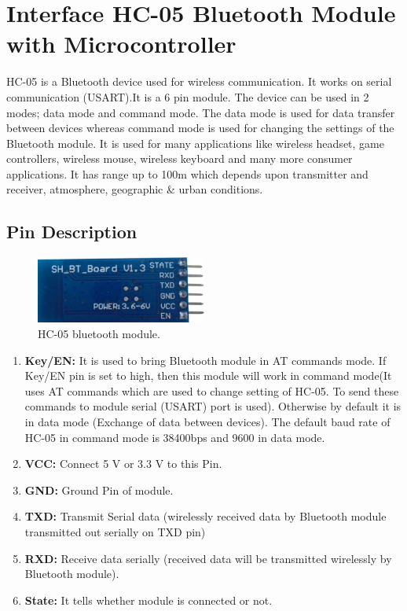 \documentclass[12pt, a4paper, twoside]{report}
\begin{document}
\section{Interface HC-05 Bluetooth Module with Microcontroller}
HC-05 is a Bluetooth device used for wireless communication. It works on serial communication (USART).It is a 6 pin module. The device can be used in 2 modes; data mode and command mode. The data mode is used for data transfer between devices whereas command mode is used for changing the settings of the Bluetooth module. It is used for many applications like wireless headset, game controllers, wireless mouse, wireless keyboard and many more consumer applications. It has range up to 100m which depends upon transmitter and receiver, atmosphere, geographic \& urban conditions.
\subsection{Pin Description}
\begin{figure}[!h]
	\centering
	\includegraphics[width=0.5\textwidth]
	{images/chapter6/hardware-2}
	\caption{HC-05 bluetooth module.}
	\label{fig:hardware-2}
\end{figure}

\begin{enumerate}[noitemsep]
\item \textbf{Key/EN:} It is used to bring Bluetooth module in AT commands mode. If Key/EN pin is set to high, then this module will work in command mode(It uses AT commands which are used to change setting of HC-05. To send these commands to module serial (USART) port is used). Otherwise by default it is in data mode (Exchange of data between devices). The default baud rate of HC-05 in command mode is 38400bps and 9600 in data mode.
\item \textbf{VCC:} Connect 5 V or 3.3 V to this Pin.
\item \textbf{GND:} Ground Pin of module.
\item \textbf{TXD:} Transmit Serial data (wirelessly received data by Bluetooth module transmitted out serially on TXD pin)
\item \textbf{RXD:} Receive data serially (received data will be transmitted wirelessly by Bluetooth module).
\item \textbf{State:} It tells whether module is connected or not.
\end{enumerate}
\end{document}
